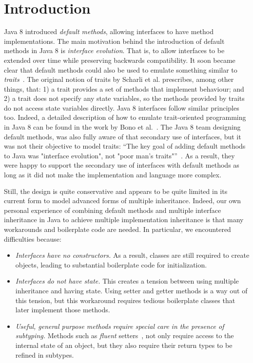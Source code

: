 \section{Introduction}\label{sec:intro}

Java 8 introduced \emph{default methods}, allowing interfaces to have
method implementations. The main motivation behind the introduction of
default methods in Java 8 is \emph{interface evolution}. That is, to
allow interfaces to be extended over time while preserving backwards
compatibility. It soon became clear that default methods could also be
used to emulate something similar to \emph{traits}~\cite{scharli03traits}. The
original notion of traits by Scharli et al. prescribes, among other
things, that: 1) a trait provides a set of methods that implement
behaviour; and 2) a trait does not specify any state variables, so the
methods provided by traits do not access state variables
directly. Java 8 interfaces follow similar principles too. Indeed, a
detailed description of how to emulate trait-oriented programming in
Java 8 can be found in the work by Bono et al.~\cite{bono14}. The Java 8
team designing default methods, was also fully aware of that secondary
use of interfaces, but it was not their objective to model traits:
``The key goal of adding default methods to Java was "interface
evolution", not "poor man's traits"''~\cite{goetz13default}. As a result, 
they were happy to support the secondary use of interfaces with
default methods as long as it did not make the implementation and
language more complex.
 
Still, the design is quite conservative and appears to be quite limited
 in its current form to model advanced forms of multiple inheritance.
Indeed, our own personal experience of combining default methods 
and multiple interface inheritance in Java to achieve multiple implementation 
inheritance is that many workarounds and boilerplate code are needed. 
In particular, we encountered difficulties because:

\begin{itemize}

\item {\em Interfaces have no constructors.} As a result, classes are 
still required to create objects, leading to substantial boilerplate 
code for initialization.

\item {\em Interfaces do not have state.} This creates a tension between 
 using multiple inheritance and having state. Using setter and
  getter methods is a way out of this tension, but this workaround
  requires tedious boilerplate classes that later implement those
  methods.

\item {\em Useful, general purpose methods require special care in
  the presence of subtyping.} Methods such as
  \emph{fluent} setters~\cite{fowler2005fluentinterface}, not only require access to the
  internal state of an object, but they also require their return types to be
  refined in subtypes.

\end{itemize}

